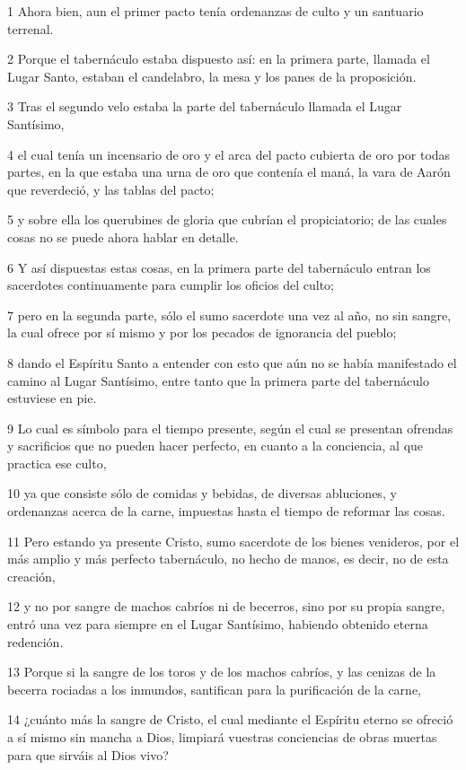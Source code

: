 \par 1 Ahora bien, aun el primer pacto tenía ordenanzas de culto y un santuario terrenal.
\par 2 Porque el tabernáculo estaba dispuesto así: en la primera parte, llamada el Lugar Santo, estaban el candelabro, la mesa y los panes de la proposición.
\par 3 Tras el segundo velo estaba la parte del tabernáculo llamada el Lugar Santísimo,
\par 4 el cual tenía un incensario de oro y el arca del pacto cubierta de oro por todas partes, en la que estaba una urna de oro que contenía el maná, la vara de Aarón que reverdeció, y las tablas del pacto;
\par 5 y sobre ella los querubines de gloria que cubrían el propiciatorio; de las cuales cosas no se puede ahora hablar en detalle.
\par 6 Y así dispuestas estas cosas, en la primera parte del tabernáculo entran los sacerdotes continuamente para cumplir los oficios del culto;
\par 7 pero en la segunda parte, sólo el sumo sacerdote una vez al año, no sin sangre, la cual ofrece por sí mismo y por los pecados de ignorancia del pueblo;
\par 8 dando el Espíritu Santo a entender con esto que aún no se había manifestado el camino al Lugar Santísimo, entre tanto que la primera parte del tabernáculo estuviese en pie.
\par 9 Lo cual es símbolo para el tiempo presente, según el cual se presentan ofrendas y sacrificios que no pueden hacer perfecto, en cuanto a la conciencia, al que practica ese culto,
\par 10 ya que consiste sólo de comidas y bebidas, de diversas abluciones, y ordenanzas acerca de la carne, impuestas hasta el tiempo de reformar las cosas.
\par 11 Pero estando ya presente Cristo, sumo sacerdote de los bienes venideros, por el más amplio y más perfecto tabernáculo, no hecho de manos, es decir, no de esta creación,
\par 12 y no por sangre de machos cabríos ni de becerros, sino por su propia sangre, entró una vez para siempre en el Lugar Santísimo, habiendo obtenido eterna redención.
\par 13 Porque si la sangre de los toros y de los machos cabríos, y las cenizas de la becerra rociadas a los inmundos, santifican para la purificación de la carne,
\par 14 ¿cuánto más la sangre de Cristo, el cual mediante el Espíritu eterno se ofreció a sí mismo sin mancha a Dios, limpiará vuestras conciencias de obras muertas para que sirváis al Dios vivo?
